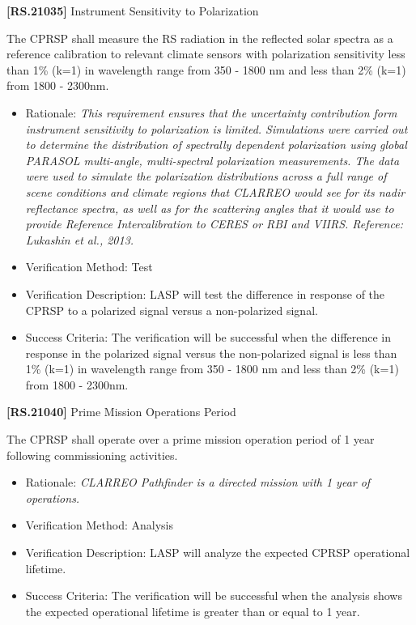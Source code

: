 \documentclass[12pt,oneside,oldfontcommands]{memoir}
\begin{document}
\textbf{[RS.21035]} Instrument Sensitivity to Polarization

The \gls{CPRSP} shall \gls{measure} the \gls{RS} radiation in the reflected solar spectra as a reference calibration to relevant climate sensors with polarization sensitivity less than 1\% (k=1) in wavelength range from 350 - 1800 nm and less than 2\% (k=1) from 1800 - 2300nm.

\begin{itemize}
\item{} Rationale: \emph{This requirement ensures that the uncertainty contribution form instrument sensitivity to polarization is limited. Simulations were carried out to determine the distribution of spectrally dependent polarization using global PARASOL multi-angle, multi-spectral polarization measurements. The data were used to simulate the polarization distributions across a full range of scene conditions and climate regions that CLARREO would see for its nadir reflectance spectra, as well as for the scattering angles that it would use to provide Reference Intercalibration to CERES or RBI and VIIRS. Reference: Lukashin et al., 2013.}

\item{} Verification Method: Test

\item{} Verification Description: \gls{LASP} will \gls{test} the difference in response of the \gls{CPRSP} to a polarized signal versus a non-polarized signal.

\item{} Success Criteria: The verification will be successful when the difference in response in the polarized signal versus the non-polarized signal is less than 1\% (k=1) in wavelength range from 350 - 1800 nm and less than 2\% (k=1) from 1800 - 2300nm.

\end{itemize}

\textbf{[RS.21040]} Prime Mission Operations Period

The \gls{CPRSP} shall operate over a prime mission operation period of 1 year following commissioning activities.

\begin{itemize}
\item{} Rationale: \emph{CLARREO Pathfinder is a directed mission with 1 year of operations.}

\item{} Verification Method: Analysis

\item{} Verification Description: \gls{LASP} will analyze the expected \gls{CPRSP} operational lifetime.

\item{} Success Criteria: The verification will be successful when the \gls{analysis} shows the expected operational lifetime is greater than or equal to 1 year.

\end{itemize}
\end{document}
